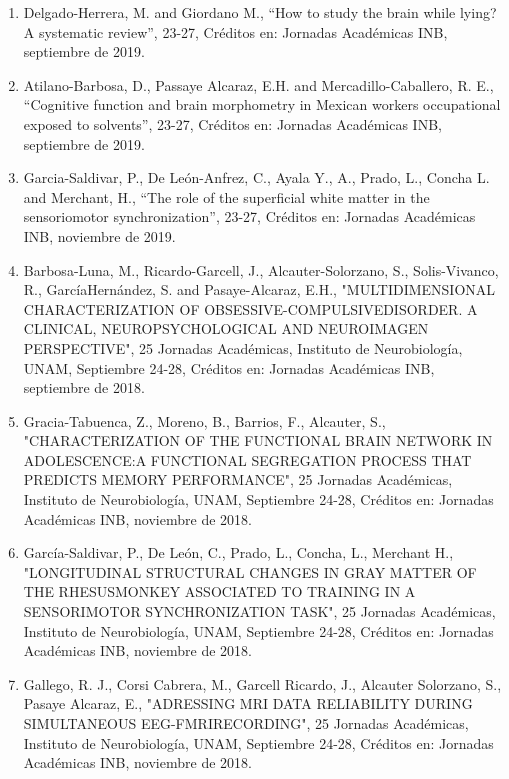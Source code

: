 \documentclass[12pt]{article}
\begin{document}
\begin{enumerate}
\item Delgado-Herrera, M. and Giordano M., “How to study the brain while lying? A systematic review”, 23-27, Créditos en: Jornadas 
Académicas INB, septiembre de 2019.

\item Atilano-Barbosa, D., Passaye Alcaraz, E.H. and Mercadillo-Caballero, R. E., “Cognitive function and brain morphometry in Mexican 
workers occupational exposed to solvents”, 23-27, Créditos en: Jornadas Académicas INB, septiembre de 2019.

\item Garcia-Saldivar, P., De León-Anfrez, C., Ayala Y., A., Prado, L., Concha L. and Merchant, H., “The role of the superficial white 
matter in the sensoriomotor synchronization”, 23-27, Créditos en: Jornadas Académicas INB, noviembre de 2019.

\item Barbosa-Luna, M., Ricardo-Garcell, J., Alcauter-Solorzano, S., Solis-Vivanco, R., GarcíaHernández, S. and Pasaye-Alcaraz, E.H., 
"MULTIDIMENSIONAL CHARACTERIZATION OF OBSESSIVE-COMPULSIVEDISORDER. A CLINICAL, NEUROPSYCHOLOGICAL AND NEUROIMAGEN PERSPECTIVE", 25 
Jornadas Académicas, Instituto de Neurobiología, UNAM, Septiembre 24-28, Créditos en: Jornadas Académicas INB, septiembre de 2018.

\item Gracia-Tabuenca, Z., Moreno, B., Barrios, F., Alcauter, S., "CHARACTERIZATION OF THE FUNCTIONAL BRAIN NETWORK IN ADOLESCENCE:A 
FUNCTIONAL SEGREGATION PROCESS THAT PREDICTS MEMORY PERFORMANCE", 25 Jornadas Académicas, Instituto de Neurobiología, UNAM, Septiembre 
24-28, Créditos en: Jornadas Académicas INB, noviembre de 2018.

\item García-Saldivar, P., De León, C., Prado, L., Concha, L., Merchant H., "LONGITUDINAL STRUCTURAL CHANGES IN GRAY MATTER OF THE 
RHESUSMONKEY ASSOCIATED TO TRAINING IN A SENSORIMOTOR SYNCHRONIZATION TASK", 25 Jornadas Académicas, Instituto de Neurobiología, UNAM, 
Septiembre 24-28, Créditos en: Jornadas Académicas INB, noviembre de 2018.

\item Gallego, R. J., Corsi Cabrera, M., Garcell Ricardo, J., Alcauter Solorzano, S., Pasaye Alcaraz, E., "ADRESSING MRI DATA 
RELIABILITY 
DURING SIMULTANEOUS EEG-FMRIRECORDING", 25 Jornadas Académicas, Instituto de Neurobiología, UNAM, Septiembre 24-28, Créditos en: 
Jornadas Académicas INB, noviembre de 2018.


\end{enumerate}
\end{document}
